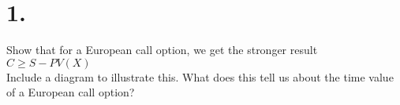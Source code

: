 \documentclass{article}
\begin{document}
\thispagestyle{firstpageheader}

\section*{1.}

{\Large 

Show that for a European call option, we get the stronger result \\
$C \geq S - PV(X) $ \\
Include a diagram to illustrate this.  What does this tell us about the time value of a European call option? \\ \\




}
\end{document}
